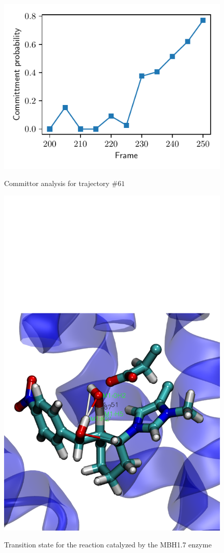 \documentclass[%
preprint,
 amsmath,amssymb,
 aps,
prb,
]{revtex4-2}
\begin{document}
%
\begin{figure}[ht!]
\centering
\includegraphics[scale=0.75]{figures/dist61.pdf}
\label{fig:comm61}
\caption{Committor analysis for trajectory $\#61$}
\end{figure}
%
\begin{figure}[ht!]
\centering
\includegraphics[scale=0.35]{figures/trans-61.pdf}
\label{fig:trans61}
\caption{Transition state for the reaction catalyzed by the MBH1.7 enzyme}
\end{figure}
\end{document}
